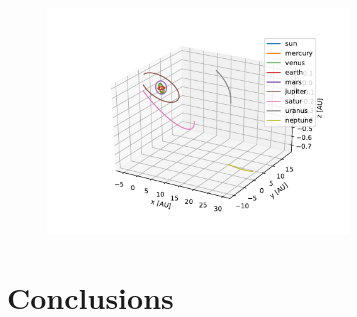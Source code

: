 \documentclass[10pt,showpacs,preprintnumbers,footinbib,amsmath,amssymb,aps,prl,twocolumn,groupedaddress,superscriptaddress,showkeys]{revtex4-1}
\begin{document}
\begin{figure}
  \center
  \\
\end{figure}

\begin{figure}
  \center
  \includegraphics[width=8cm]{figs/all_planets3d.pdf}
\end{figure}




\section{Conclusions}
\end{document}
